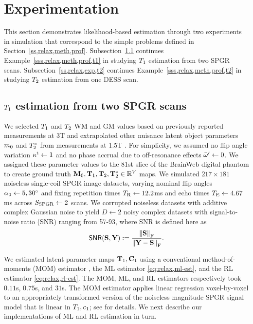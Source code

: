 
\section{Experimentation}
\label{s,relax,exp}

This section demonstrates likelihood-based estimation
through two experiments in simulation
that correspond to the simple problems defined
in Section~\ref{ss,relax,meth,prof}.
Subsection~\ref{ss,relax,exp,t1} continues Example~\ref{sss,relax,meth,prof,t1}
in studying $T_1$ estimation
from two SPGR scans.
Subsection~\ref{ss,relax,exp,t2} continues Example~\ref{sss,relax,meth,prof,t2}
in studying $T_2$ estimation
from one DESS scan.

\subsection{$T_1$ estimation from two SPGR scans}
\label{ss,relax,exp,t1}

We selected $T_1$ and $T_2$ WM and GM values
based on previously reported measurements at 3T 
\cite{wansapura:99:nrt, stanisz:05:ttr}
and extrapolated other nuisance latent object parameters
$m_0$ and $T_2^*$
from measurements at 1.5T \cite{kwan:99:msb}.
For simplicity,
we assumed no flip angle variation $\kappa^{\mathrm{t}} \gets 1$ 
and no phase accrual due to off-resonance effects $\bar{\omega}' \gets 0$.
We assigned these parameter values
to the 81st slice
of the BrainWeb digital phantom
\cite{collins:98:dac, kwan:99:msb}
to create ground truth $\mathbf{M}_0, \mathbf{T}_1, \mathbf{T}_2, \mathbf{T}_2^* \in \mathbb{R}^{V}$ maps.
We simulated $217 \times 181$
noiseless single-coil SPGR image datasets,
varying nominal flip angles $\alpha_0 \gets 5,30^{\circ}$
and fixing repetition times $T_\mathrm{R} \gets 12.2$ms 
and echo times $T_\mathrm{E} \gets 4.67$ms across $S_{\mathrm{SPGR}} \gets 2$ scans.
We corrupted noiseless datasets
with additive complex Gaussian noise
to yield $D \gets 2$ noisy complex datasets
with signal-to-noise ratio (SNR) ranging from 57-93,
where SNR is defined here as
\begin{align}
	\snr{\bmS,\bmY} := \frac{\frob{\bmS}}{\frob{\bmY-\bmS}}.
	\label{eq:relax,snr}
\end{align}

We estimated latent parameter maps $\mathbf{T}_1,\mathbf{C}_{1}$ 
using a conventional method-of-moments (MOM) estimator \cite{gupta:77:anl},
the ML estimator \eqref{eq:relax,ml-est}, 
and the RL estimator \eqref{eq:relax,rl-est}.
The MOM, ML, and RL estimators 
respectively took $0.11$s, $0.75$s, and $31$s. 
The MOM estimator applies linear regression voxel-by-voxel
to an appropriately transformed version
of the noiseless magnitude SPGR signal model
that is linear in $T_1,c_{1}$;
see \eg \cite{gupta:77:anl,deoni:03:rct} for details.
We next describe our implementations 
of ML and RL estimation in turn.

